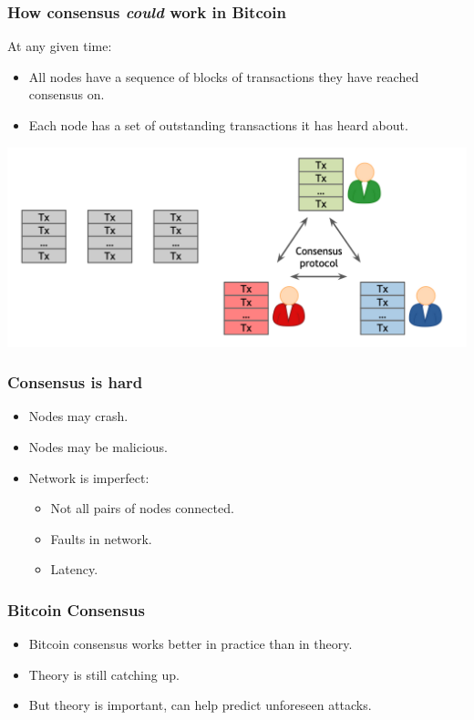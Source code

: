 \documentclass{beamer}
\begin{document}
\begin{frame}
  \frametitle{How consensus \emph{could} work in Bitcoin}
  
At any given time:

\begin{itemize}
	\item All nodes have a sequence of blocks of transactions they have reached consensus on.
	\item Each node has a set of outstanding transactions it has heard about.
\end{itemize}
\pause
	\includegraphics[scale=0.5]{consensus}
\end{frame}
\begin{frame}
  \frametitle{Consensus is hard}
  \begin{itemize}
  	\item Nodes may crash.
	\item Nodes may be malicious. \pause
	\item Network is imperfect:
	\begin{itemize}
		\item Not all pairs of nodes connected.
		\item Faults in network.
		\item Latency.
	\end{itemize}
  \end{itemize}
\end{frame}
\begin{frame}
  \frametitle{Bitcoin Consensus}
 
	\begin{itemize}
		\item Bitcoin consensus works better in practice than in theory.
		\item Theory is still catching up. \pause
		\item But theory is important, can help predict unforeseen attacks.
	\end{itemize}

\end{frame}
\end{document}
